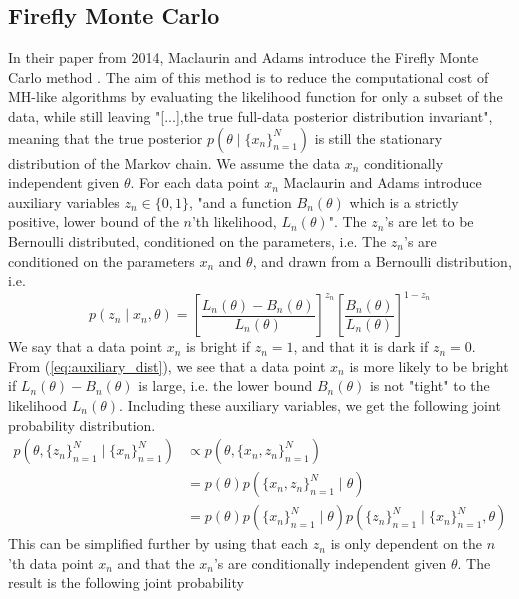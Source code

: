 \documentclass{article}
\theoremstyle{definition}
\begin{document}
\subsection{Firefly Monte Carlo}
In their paper from 2014, Maclaurin and Adams  introduce the Firefly Monte Carlo method \cite{Maclaurin:1}. The aim of this method is to reduce the computational cost of MH-like algorithms by evaluating the likelihood function for only a subset of the data, while still leaving "[...],the true full-data posterior distribution invariant", meaning that the true posterior $p(\theta\mid\{x_n\}_{n=1}^N)$ is still the stationary distribution of the Markov chain.  
We assume the data $x_n$ conditionally independent given $\theta$.
For each data point $x_n$ Maclaurin and Adams introduce auxiliary variables $z_n \in \{0, 1\}$, "and a function $B_n(\theta)$ which is a strictly positive, lower bound of the $n$'th likelihood, $L_n(\theta)$". 
The $z_n$'s are let to be Bernoulli distributed, conditioned on the parameters, i.e.
The $z_n$'s are conditioned on the parameters $x_n$ and $\theta$, and drawn from a Bernoulli distribution, i.e.
\begin{equation}\label{eq:auxiliary_dist}
    p(z_n\mid x_n,\theta) = \left[\frac{L_n(\theta) - B_n(\theta)}{L_n(\theta)}\right]^{z_n}\left[\frac{B_n(\theta)}{L_n(\theta)}\right]^{1-z_n}
\end{equation}
We say that a data point $x_n$ is bright if $z_n = 1$, and that it is dark if $z_n = 0$. From (\ref{eq:auxiliary_dist}), we see that a data point $x_n$ is more likely to be bright if $L_n(\theta) - B_n(\theta)$ is large, i.e. the lower bound $B_n(\theta)$ is not "tight" to the likelihood $L_n(\theta)$. Including these auxiliary variables, we get the following joint probability distribution. 
\begin{equation*}
\begin{split}
     p(\theta, \{z_n\}_{n=1}^N\mid\{x_n\}_{n=1}^N) &\propto p(\theta, \{x_n, z_n\}_{n = 1}^N) \\
     &= p(\theta) p(\{x_n, z_n\}_{n=1}^N\mid\theta) \\
     & = p(\theta)p(\{x_n\}_{n=1}^N\mid\theta)p(\{z_n\}_{n=1}^N\mid \{x_n\}_{n=1}^N, \theta)
\end{split}
\end{equation*}{}
 This can be simplified further by using that each $z_n$ is only dependent on the $n$'th data point $x_n$ and that the $x_n$'s are conditionally independent given $\theta$. The result is the following joint probability 
\end{document}
